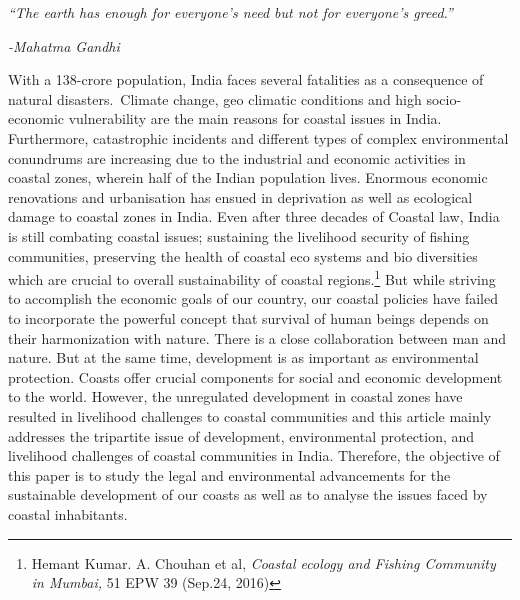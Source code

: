 \setcounter{figure}{0}
\setcounter{table}{0}
\setcounter{footnote}{0}



\begin{multicols}{2}

\noi
\textit{“The earth has enough for everyone’s need but not for everyone’s greed.”}
 
\vspace{-.3cm} 
 
{\hfill\textit{-Mahatma Gandhi}}

\vspace{-.3cm}  
 

\noi
With a 138-crore population, India faces several fatalities as a consequence of natural
disasters.~Climate change, geo climatic conditions and high socio-economic vulnerability are
the main reasons for coastal issues in India. Furthermore, catastrophic incidents and different
types of complex environmental conundrums are increasing due to the industrial and
economic activities in coastal zones, wherein half of the Indian population lives. Enormous
economic renovations and urbanisation has ensued in deprivation as well as ecological
damage to coastal zones in India. Even after three decades of Coastal law, India is still
combating coastal issues; sustaining the livelihood security of fishing communities,
preserving the health of coastal eco systems and bio diversities which are crucial to overall
sustainability of coastal regions.\footnote{Hemant Kumar. A. Chouhan et al, \textit{Coastal ecology and Fishing Community in Mumbai,} 51 EPW 39 (Sep.24,
2016) } But while striving to accomplish the economic goals of our
country, our coastal policies have failed to incorporate the powerful concept that survival of
human beings depends on their harmonization with nature. There is a close collaboration
between man and nature. But at the same time, development is as important as environmental
protection. Coasts offer crucial components for social and economic development to the
world. However, the unregulated development in coastal zones have resulted in livelihood
challenges to coastal communities and this article mainly addresses the tripartite issue of
development, environmental protection, and livelihood challenges of coastal communities in
India. Therefore, the objective of this paper is to study the legal and environmental
advancements for the sustainable development of our coasts as well as to analyse the issues
faced by coastal inhabitants.


\end{multicols}
